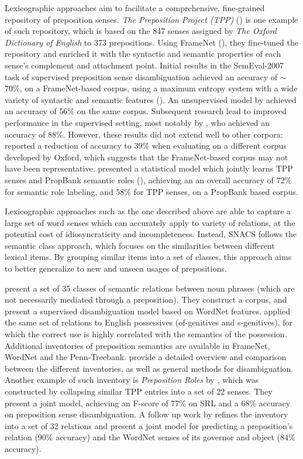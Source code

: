 Lexicographic approaches aim to facilitate a comprehensive, fine-grained repository of preposition senses. \textit{The Preposition Project (TPP)} (\cite{litkowski-05}) is one example of such repository, which is based on the 847 senses assigned by \textit{The Oxford Dictionary of English} to 373 prepositions. Using FrameNet (\cite{baker-98}), they fine-tuned the repository and enriched it with the syntactic and semantic properties of each sense's complement and attachment point. Initial results in the SemEval-2007 task of supervised preposition sense disambiguation achieved an accuracy of $\sim$70\%, on a FrameNet-based corpus, using a maximum entropy system with a wide variety of syntactic and semantic
features (\cite{ye2007melb}). An unsupervised model by \cite{hovy-11} achieved an accuracy of $56\%$ on the same corpus. Subsequent research lead to improved performance in the supervised setting, most notably by \cite{tratz2011semantically}, who achieved an accuracy of $88\%$. 
However, these results did not extend well to other corpora: \cite{litkowski2013preposition} reported a reduction of accuracy to $39\%$ when evaluating on a different corpus developed by Oxford, which suggests that the FrameNet-based corpus may not have been representative. \cite{dahlmeier-09} presented a statistical model which jointly learns TPP senses and PropBank semantic roles (\cite{kingsbury2002treebank}), achieving an an overall accuracy of $72\%$ for semantic role labeling, and $58\%$ for TPP senses, on a PropBank based corpus.

Lexicographic approaches such as the one described above are able to capture a large set of word senses which can accurately apply to variety of relations, at the potential cost of idiosyncraticity and incompleteness. Instead, SNACS follows the semantic class approach, which focuses on the similarities between different lexical items. By grouping similar items into a set of classes, this approach aims to better generalize to new and unseen usages of prepositions.

\cite{moldovan-04} present a set of 35 classes of semantic relations between noun phrases (which are not necessarily mediated through a preposition). They construct a corpus, and present a supervised disambiguation model based on WordNet features. \cite{badulescu-09} applied the same set of relations to English possessives (of-genitives and s-genitives), for which the correct use is highly correlated with the semantics of the possession. Additional inventories of preposition semantics are available in FrameNet, WordNet and the Penn-Treebank. \cite{ohara-09} provide a detailed overview and comparison between the different inventories, as well as general methods for disambiguation. Another example of such inventory is \textit{Preposition Roles} by \cite{srikumar-11}, which was constructed by collapsing similar TPP entries into a set of 22 senses. They present a joint model, achieving an F-score of 77\% on SRL and a 68\% accuracy on preposition sense disambiguation. A follow up work by \cite{srikumar-13} refines the inventory into a set of 32 relations and present a joint model for predicting a preposition's relation (90\% accuracy) and the WordNet senses of its governor and object (84\% accuracy). 

